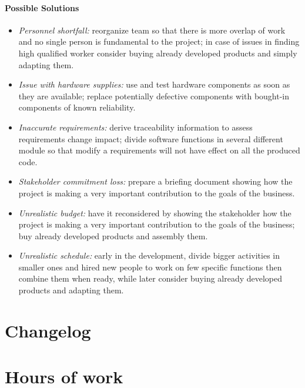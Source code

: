 \documentclass[english]{article}
\begin{document}
\paragraph{Possible Solutions}
\begin{itemize}

\item \textit{Personnel shortfall:} reorganize team so that there is more overlap of work and no single person is fundamental to the project; in case of issues in finding high qualified worker consider buying already developed products and simply adapting them.

\item \textit{Issue with hardware supplies:} use and test hardware components as soon as they are available; replace potentially defective components with bought-in components of known reliability.

\item \textit{Inaccurate requirements:} derive traceability information to assess requirements change impact; divide software functions in several different module so that modify a requirements will not have effect on all the produced code. 

\item \textit{Stakeholder commitment loss:} prepare a briefing document showing how the project is making a very important contribution to the goals of the business.

\item \textit{Unrealistic budget:} have it reconsidered by showing the stakeholder how the project is making a very important contribution to the goals of the business; buy already developed products and assembly them. 

\item \textit{Unrealistic schedule:} early in the development, divide bigger activities in smaller ones and hired new people to work on few specific functions then combine them when ready, while later consider buying already developed products and adapting them.
\end{itemize}


\appendix

\section{Changelog}

\section{Hours of work}
\end{document}
